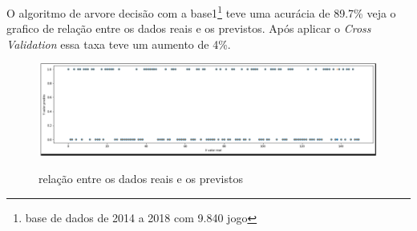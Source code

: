 O algoritmo de arvore decisão com a base1\footnote[4]{base de dados de 2014 a 2018 com 9.840 jogo} teve uma acurácia de 89.7\% veja o grafico de relação entre os dados reais e os previstos. Após aplicar o \textit{Cross Validation} essa taxa teve um aumento de 4\%.
\begin{figure}[htbp]
	\begin{center}
		\includegraphics[width=1.2\linewidth]{imagens/arvoredecisao.png}\\
	\end{center}
	\caption[relação entre os dados reais e os previstos]{relação entre os dados reais e os previstos}
	\label{fig:logo}
\end{figure}


